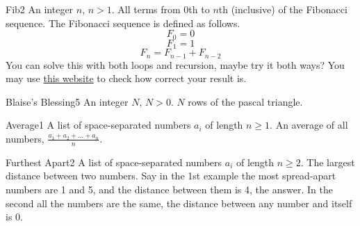 \begin{task}{Fib}{2}
    \In
    An integer $n$, $n > 1$.
    \Out
    All terms from 0th to $n$th (inclusive) of the Fibonacci sequence.
    The Fibonacci sequence is defined as follows.
    $$F_0 = 0$$
    $$F_1 = 1$$
    $$F_n = F_{n - 1} + F_{n - 2}$$
    \Note
    You can solve this with both loops and recursion, maybe try it both ways?
    You may use \href{https://oeis.org/}{this website} to check how correct your result is.
    \begin{ExampleIO}
    \end{ExampleIO}
\end{task}

\begin{task}{Blaise's Blessing}{5}
    \In
    An integer $N$, $N > 0$.
    \Out
    $N$ rows of the pascal triangle.

    \begin{ExampleIO}
    \end{ExampleIO}
\end{task}


\begin{task}{Average}{1}
    \In
    A list of space-separated numbers $a_i$ of length $n \geq 1$. 
    \Out
    An average of all numbers, $\frac{a_1 + a_2 + \dots + a_n}{n}$.

    \begin{ExampleIO}
    \end{ExampleIO}
\end{task}


\begin{task}{Furthest Apart}{2}
    \In
    A list of space-separated numbers $a_i$ of length $n \geq 2$. 
    \Out
    The largest distance between two numbers.
    \Note 
    Say in the 1st example the most spread-apart numbers are 1 and 5, and the
    distance between them is 4, the answer. In the second all the numbers are the
    same, the distance between any number and itself is 0.
    \begin{ExampleIO}
    \end{ExampleIO}
\end{task}


